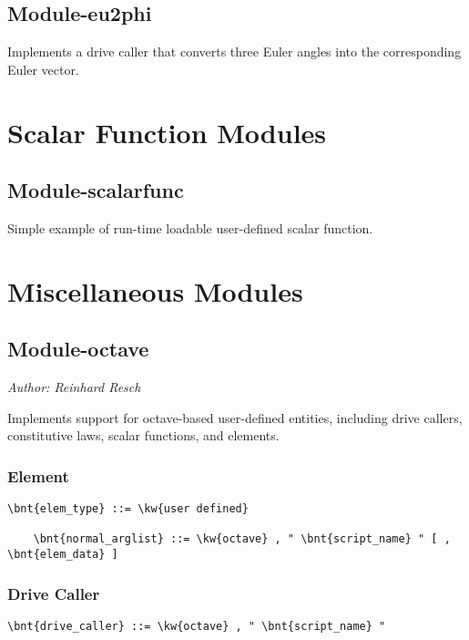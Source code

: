 \subsection{Module-eu2phi}
Implements a  drive caller
that converts three Euler angles into the corresponding Euler vector.



\section{Scalar Function Modules}

\subsection{Module-scalarfunc}
Simple example of run-time loadable user-defined scalar function.



\section{Miscellaneous Modules}

\subsection{Module-octave}
\emph{Author: Reinhard Resch}

\noindent
Implements support for octave-based user-defined entities, including
drive callers, constitutive laws, scalar functions, and elements.

\subsubsection{Element}
\begin{Verbatim}[commandchars=\\\{\}]
    \bnt{elem_type} ::= \kw{user defined}

    \bnt{normal_arglist} ::= \kw{octave} , " \bnt{script_name} " [ , \bnt{elem_data} ]
\end{Verbatim}

\subsubsection{Drive Caller}
\begin{Verbatim}[commandchars=\\\{\}]
    \bnt{drive_caller} ::= \kw{octave} , " \bnt{script_name} "
\end{Verbatim}


